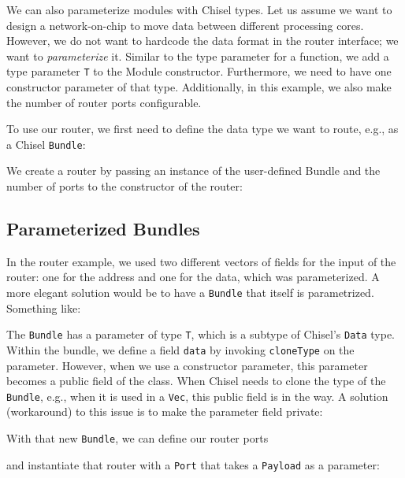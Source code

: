\documentclass[%
    10pt,
    headinclude, footexclude,
    openright, %
    notitlepage,
    cleardoubleempty,
    headsepline,
    pointlessnumbers,
    bibtotoc, idxtotoc,
    ]{scrbook}
\newcommand{\code}[1]{{\lstinline[basicstyle=\small\ttfamily]{#1}}}
\begin{document}
We can also parameterize modules with Chisel types.
Let us assume we want to design a network-on-chip to move data between
different processing cores. However, we do not want to hardcode the
data format in the router interface; we want to \emph{parameterize} it.
Similar to the type parameter for a function, we add a type parameter \code{T}
to the Module constructor. Furthermore, we need to have one constructor
parameter of that type. Additionally, in this example, we also make the number
of router ports configurable.


\noindent To use our router, we first need to define the data type we want to route, e.g.,
as a Chisel \code{Bundle}:


\noindent We create a router by passing an instance of the user-defined Bundle and
the number of ports to the constructor of the router:


\subsection{Parameterized Bundles}

In the router example, we used two different vectors of fields for the input
of the router: one for the address and one for the data, which was parameterized.
A more elegant solution would be to have a \code{Bundle} that itself
is parametrized. Something like:


The \code{Bundle} has a parameter of type \code{T}, which is a subtype
of Chisel's \code{Data} type.
Within the bundle, we define a field \code{data} by invoking \code{cloneType}
on the parameter.
However, when we use a constructor parameter, this parameter becomes a
public field of the class. When Chisel needs to clone the type of the \code{Bundle},
e.g., when it is used in a \code{Vec}, this public field is in the way.
A solution (workaround) to this issue is to make the parameter field private:


\noindent With that new \code{Bundle}, we can define our router ports


\noindent and instantiate that router with a \code{Port} that takes
a \code{Payload} as a parameter:
\end{document}

